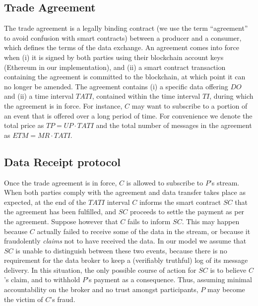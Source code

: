 \documentclass[letterpaper, 10 pt, conference]{ieeeconf}  %
\newcommand{\ti}{\ensuremath{\mathit{TI}}}
\newcommand{\mr}{\ensuremath{\mathit{MR}}}
\newcommand{\up}{\ensuremath{\mathit{UP}}}
\newcommand{\doff}{\ensuremath{\mathit{DO}}}
\newcommand{\tati}{\ensuremath{\mathit{TATI}}}
\newcommand{\etm}{\ensuremath{\mathit{ETM}}}
\newcommand{\tp}{\ensuremath{\mathit{TP}}}
\newcommand{\smartc}{\ensuremath{\mathit{SC}}}
\begin{document}
\subsection{Trade Agreement} \label{sec:agreement}

The trade agreement is a legally binding contract (we use the term ``agreement'' to avoid confusion with smart contracts) between a producer and a consumer, which defines the terms of the data exchange.
An agreement comes into force when (i) it is signed by both parties using their blockchain account keys (Ethereum in our implementation), and (ii) a smart contract transaction containing the agreement is committed to the blockchain, at which point it can no longer be amended.
The agreement contains (i) a specific data offering \doff{} and (ii) a time interval $\tati$, contained within the time interval \ti, during which the agreement is in force.
For instance, $C$ may want to subscribe to a portion of an event that is offered over a long period of time.
For convenience we denote the total price as $\tp = \up \cdot \tati$ and the total number of messages in the agreement as $\etm = \mr \cdot \tati$.

%
%
%

\subsection{Data Receipt protocol}  \label{sec:protocol}

Once the trade agreement is in force,  $C$ is allowed to subscribe to $P$'s stream.
When both parties comply with the agreement and data transfer takes place as expected, at the end of the \tati{} interval $C$ informs the smart contract \smartc{} that the agreement has been fulfilled, and \smartc{} proceeds to settle the payment as per the agreement.
Suppose however that $C$ fails to inform \smartc. This may happen because $C$ actually failed to receive some of the data in the stream, or because it fraudolently \textit{claims} not to have received the data.
In our model we assume that \smartc{} is unable to distinguish between these two events, because there is no requirement for the data broker to keep a (verifiably truthful) log of its message delivery.
In this situation, the only possible course of action for \smartc{} is to believe $C$'s claim, and to withhold $P$'s payment as a consequence.
Thus, assuming minimal accountability on the broker and no trust amongst participants, $P$ may become the victim of $C$'s fraud.
\end{document}
